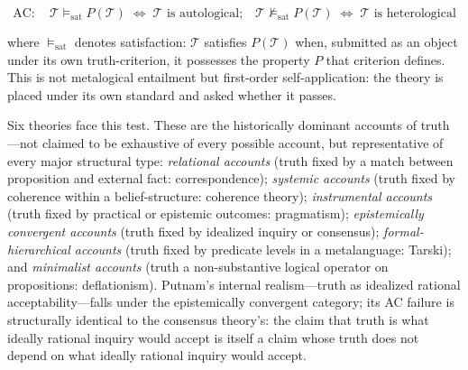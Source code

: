 \documentclass[11pt, oneside]{article}
\begin{document}
\[
\boxed{\mathrm{AC{:}}\quad
\mathcal{T} \models_{\mathrm{sat}} P(\mathcal{T}) \;\Leftrightarrow\;
\mathcal{T} \text{ is autological;}
\quad
\mathcal{T} \not\models_{\mathrm{sat}} P(\mathcal{T}) \;\Leftrightarrow\;
\mathcal{T} \text{ is heterological}}
\]

\noindent where $\models_{\mathrm{sat}}$ denotes satisfaction:
$\mathcal{T}$ satisfies $P(\mathcal{T})$ when, submitted as an object
under its own truth-criterion, it possesses the property $P$ that
criterion defines. This is not metalogical entailment but first-order
self-application: the theory is placed under its own standard and asked
whether it passes.

Six theories face this test. These are the historically dominant accounts
of truth---not claimed to be exhaustive of every possible account, but
representative of every major structural type: \textit{relational
accounts} (truth fixed by a match between proposition and external fact:
correspondence); \textit{systemic accounts} (truth fixed by coherence
within a belief-structure: coherence theory); \textit{instrumental
accounts} (truth fixed by practical or epistemic outcomes: pragmatism);
\textit{epistemically convergent accounts} (truth fixed by idealized
inquiry or consensus); \textit{formal-hierarchical accounts} (truth fixed
by predicate levels in a metalanguage: Tarski); and \textit{minimalist
accounts} (truth a non-substantive logical operator on propositions:
deflationism). Putnam's internal realism---truth as idealized rational
acceptability---falls under the epistemically convergent category; its
AC failure is structurally identical to the consensus theory's: the
claim that truth is what ideally rational inquiry would accept is itself
a claim whose truth does not depend on what ideally rational inquiry
would accept.
\end{document}
